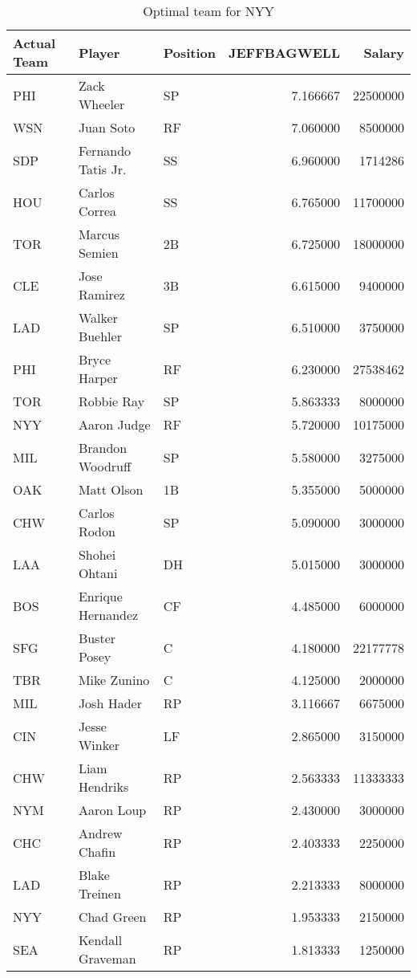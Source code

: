 \begin{table}

\caption{Optimal team for NYY}
\centering
\begin{tabular}[t]{l|l|l|r|r}
\hline
Actual Team & Player & Position & JEFFBAGWELL & Salary\\
\hline
PHI & Zack Wheeler & SP & 7.166667 & 22500000\\
\hline
WSN & Juan Soto & RF & 7.060000 & 8500000\\
\hline
SDP & Fernando Tatis Jr. & SS & 6.960000 & 1714286\\
\hline
HOU & Carlos Correa & SS & 6.765000 & 11700000\\
\hline
TOR & Marcus Semien & 2B & 6.725000 & 18000000\\
\hline
CLE & Jose Ramirez & 3B & 6.615000 & 9400000\\
\hline
LAD & Walker Buehler & SP & 6.510000 & 3750000\\
\hline
PHI & Bryce Harper & RF & 6.230000 & 27538462\\
\hline
TOR & Robbie Ray & SP & 5.863333 & 8000000\\
\hline
NYY & Aaron Judge & RF & 5.720000 & 10175000\\
\hline
MIL & Brandon Woodruff & SP & 5.580000 & 3275000\\
\hline
OAK & Matt Olson & 1B & 5.355000 & 5000000\\
\hline
CHW & Carlos Rodon & SP & 5.090000 & 3000000\\
\hline
LAA & Shohei Ohtani & DH & 5.015000 & 3000000\\
\hline
BOS & Enrique Hernandez & CF & 4.485000 & 6000000\\
\hline
SFG & Buster Posey & C & 4.180000 & 22177778\\
\hline
TBR & Mike Zunino & C & 4.125000 & 2000000\\
\hline
MIL & Josh Hader & RP & 3.116667 & 6675000\\
\hline
CIN & Jesse Winker & LF & 2.865000 & 3150000\\
\hline
CHW & Liam Hendriks & RP & 2.563333 & 11333333\\
\hline
NYM & Aaron Loup & RP & 2.430000 & 3000000\\
\hline
CHC & Andrew Chafin & RP & 2.403333 & 2250000\\
\hline
LAD & Blake Treinen & RP & 2.213333 & 8000000\\
\hline
NYY & Chad Green & RP & 1.953333 & 2150000\\
\hline
SEA & Kendall Graveman & RP & 1.813333 & 1250000\\
\hline
\end{tabular}
\end{table}
